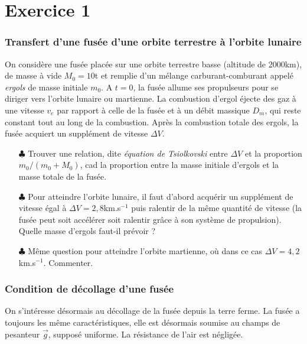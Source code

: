 \documentclass{report}
\begin{document}
\section*{Exercice 1}

\subsubsection*{Transfert d'une fusée d'une orbite terrestre à l'orbite lunaire}

On considère une fusée placée sur une orbite terrestre basse (altitude de 2000km), de masse à vide $M_0=10$t et remplie d'un mélange carburant-comburant appelé \textit{ergols} de masse initiale $m_0$. A $t=0$, la fusée allume ses propulseurs pour se diriger vers l'orbite lunaire ou martienne. La combustion d'ergol éjecte des gaz à une vitesse $v_e$ par rapport à celle de la fusée et à un débit massique $D_m$, qui reste constant tout au long de la combustion. Après la combustion totale des ergols, la fusée acquiert un supplément de vitesse $\Delta V$.

\begin{itemize}

	\item[$\clubsuit$] Trouver une relation, dite \textit{équation de Tsiolkovski} entre $\Delta V$ et la proportion $m_0/(m_0+M_0)$, cad la proportion entre la masse initiale d'ergols et la masse totale de la fusée. 
	
	\item[$\clubsuit$] Pour atteindre l'orbite lunaire, il faut d'abord acquérir un supplément de vitesse égal à $\Delta V=2,8$km.s$^{-1}$ puis ralentir de la même quantité de vitesse (la fusée peut soit accélérer soit ralentir grâce à son système de propulsion). Quelle masse d'ergols faut-il prévoir ?
	
	\item[$\clubsuit$] Même question pour atteindre l'orbite martienne, où dans ce cas $\Delta V=4,2$km.s$^{-1}$. Commenter. 
	
\end{itemize}

\subsubsection*{Condition de décollage d'une fusée}

On s'intéresse désormais au décollage de la fusée depuis la terre ferme. La fusée a toujours les même caractéristiques, elle est désormais soumise au champs de pesanteur $\vec{g}$, supposé uniforme. La résistance de l'air est négligée. 
\end{document}
